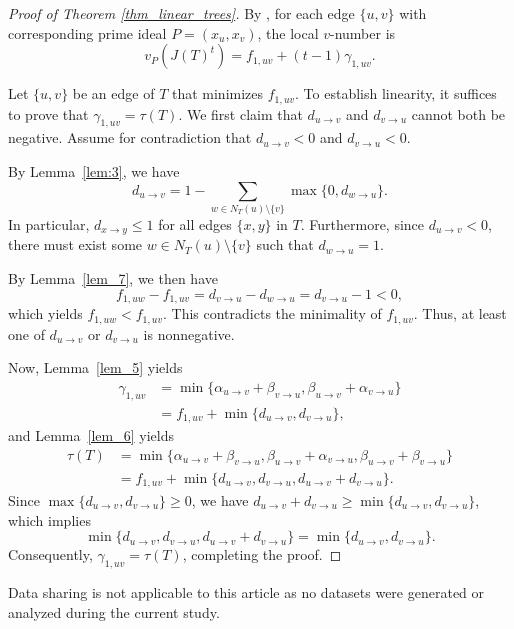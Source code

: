\documentclass[12pt,amscd]{amsart}
\theoremstyle{definition}
\numberwithin{equation}{section}
\begin{document}
\begin{proof}[Proof of Theorem \ref{thm_linear_trees}] 
By \cite[Theorem 1.3]{V}, for each edge $\{u,v\}$ with corresponding prime ideal $P = (x_u, x_v)$, the local $v$-number is 
\[
v_P(J(T)^t) = f_{1,uv} + (t-1) \gamma_{1,uv}.
\]

Let $\{u,v\}$ be an edge of $T$ that minimizes $f_{1,uv}$. To establish linearity, it suffices to prove that $\gamma_{1,uv} = \tau(T)$. We first claim that $d_{u \to v}$ and $d_{v \to u}$ cannot both be negative. Assume for contradiction that $d_{u \to v} < 0$ and $d_{v \to u} < 0$. 

By Lemma~\ref{lem:3}, we have 
\[
d_{u \to v} = 1 - \sum_{w \in N_T(u) \setminus \{v\}} \max \{ 0, d_{w \to u} \}.
\]
In particular, $d_{x \to y} \le 1$ for all edges $\{x,y\}$ in $T$. Furthermore, since $d_{u \to v} < 0$, there must exist some $w \in N_T(u) \setminus \{v\}$ such that $d_{w \to u} = 1$. 

By Lemma~\ref{lem_7}, we then have 
\[
f_{1,uw} - f_{1,uv} = d_{v \to u} - d_{w \to u} = d_{v \to u} - 1 < 0,
\]
which yields $f_{1,uw} < f_{1,uv}$. This contradicts the minimality of $f_{1,uv}$. Thus, at least one of $d_{u \to v}$ or $d_{v \to u}$ is nonnegative.

Now, Lemma~\ref{lem_5} yields 
\begin{align*}
\gamma_{1,uv} &= \min \{ \alpha_{u \to v} + \beta_{v \to u}, \beta_{u \to v} + \alpha_{v \to u} \} \\
&= f_{1,uv} + \min \{ d_{u \to v}, d_{v \to u} \},
\end{align*}
and Lemma~\ref{lem_6} yields 
\begin{align*}
\tau(T) &= \min \{ \alpha_{u \to v} + \beta_{v \to u}, \beta_{u \to v} + \alpha_{v \to u}, \beta_{u \to v} + \beta_{v \to u} \} \\
&= f_{1,uv} + \min \{ d_{u \to v}, d_{v \to u}, d_{u \to v} + d_{v \to u} \}.
\end{align*}
Since $\max \{ d_{u \to v}, d_{v \to u} \} \ge 0$, we have $d_{u \to v} + d_{v \to u} \ge \min \{ d_{u \to v}, d_{v \to u} \}$, which implies 
\[
\min \{ d_{u \to v}, d_{v \to u}, d_{u \to v} + d_{v \to u} \} = \min \{ d_{u \to v}, d_{v \to u} \}.
\]
Consequently, $\gamma_{1,uv} = \tau(T)$, completing the proof.
\end{proof}

\vspace{0.2cm}
 Data sharing is not applicable to this article as no datasets were generated or analyzed during the current study.
\vspace{0.2cm}
\end{document}
